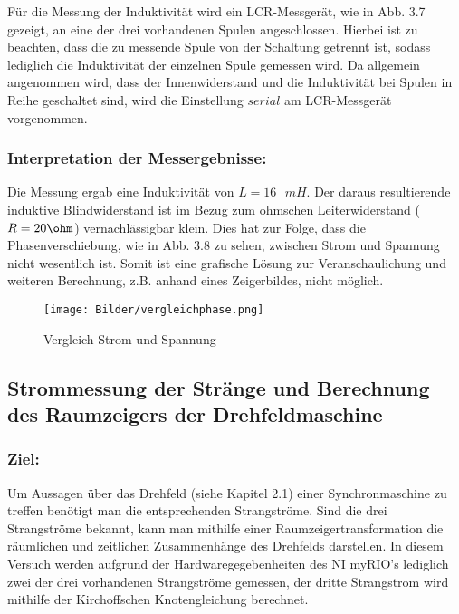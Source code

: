 Für die Messung der Induktivität wird ein LCR-Messgerät, wie in Abb. 3.7 gezeigt, an eine der drei vorhandenen Spulen angeschlossen. Hierbei ist zu beachten, dass die zu messende Spule von der Schaltung getrennt ist, sodass lediglich die Induktivität der einzelnen Spule gemessen wird. Da allgemein angenommen wird, dass der Innenwiderstand und die Induktivität bei Spulen in Reihe geschaltet sind, wird die Einstellung $serial$ am LCR-Messgerät vorgenommen.

\subsubsection{Interpretation der Messergebnisse:}

Die Messung ergab eine Induktivität von $L=16 \text{ } \si{mH}$. Der daraus resultierende induktive Blindwiderstand ist im Bezug zum ohmschen Leiterwiderstand ($R=20\ohm$) vernachlässigbar klein. Dies hat zur Folge, dass die Phasenverschiebung, wie in Abb. 3.8 zu sehen, zwischen Strom und Spannung nicht wesentlich ist. Somit ist eine grafische Lösung zur Veranschaulichung und weiteren Berechnung, z.B. anhand eines Zeigerbildes, nicht möglich.


\begin{figure}[H]
	\centering
	\texttt{[image: Bilder/vergleichphase.png]} 
	\caption{Vergleich Strom und Spannung}
\end{figure}




\subsection{Strommessung der Stränge und Berechnung des Raumzeigers der Drehfeldmaschine}
\subsubsection{Ziel:}
\label{sec:zielstrommessung}


Um Aussagen über das Drehfeld (siehe Kapitel 2.1) einer Synchronmaschine zu treffen benötigt man die entsprechenden Strangströme. Sind die drei Strangströme bekannt, kann man mithilfe einer Raumzeigertransformation die räumlichen und zeitlichen Zusammenhänge des Drehfelds darstellen.\cite{schroeder,binder}\newline
In diesem Versuch werden aufgrund der Hardwaregegebenheiten des NI myRIO's lediglich zwei der drei vorhandenen Strangströme gemessen, der dritte Strangstrom wird mithilfe der Kirchoffschen Knotengleichung berechnet.

